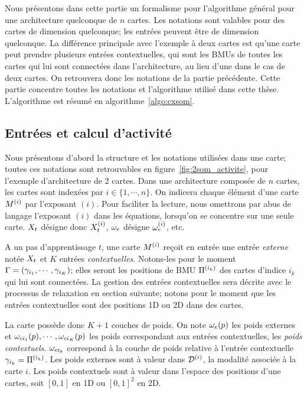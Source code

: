 Nous présentons dans cette partie un formalisme pour l'algorithme général pour une architecture quelconque de $n$ cartes. Les notations sont valables pour des cartes de dimension quelconque; les entrées peuvent être de dimension quelconque.
La différence principale avec l'exemple à deux cartes est qu'une carte peut prendre plusieurs entrées contextuelles, qui sont les BMUs de toutes les cartes qui lui sont connectées dans l'architecture, au lieu d'une dans le cas de deux cartes. On retrouvera donc les notations de la partie précédente.
Cette partie concentre toutes les notations et l'algorithme utilisé dans cette thèse. L'algorithme est résumé en algorithme~\ref{algo:cxsom}.

\subsection{Entrées et calcul d'activité}

Nous présentons d'abord la structure et les notations utilisées dans une carte; toutes ces notations sont retrouvables en figure~\ref{fig:2som_activite}, pour l'exemple d'architecture de 2 cartes. Dans une architecture composée de $n$ cartes, les cartes sont indexées par $i \in \{1,\cdots,n\}$. On indicera chaque élément d'une carte $M^{({i})}$ par l'exposant $(i)$.
Pour faciliter la lecture, nous omettrons par abus de langage l'exposant $(i)$ dans les équations, lorsqu'on se concentre sur une seule carte. $X_t$ désigne donc $X_t^{({i})}$, $\omega_e$ désigne $\omega_e^{({i})}$, etc.


A un pas d'apprentissage $t$, une carte $M^{({i})}$ reçoit en entrée une entrée \emph{externe} notée $X_t$ et $K$ entrées \emph{contextuelles}. Notons-les pour le moment $\Gamma = (\gamma_{i_1},\cdots,\gamma_{i_K})$; elles seront les positions de BMU $\Pi^{({i_k})}$ des cartes d'indice $i_k$ qui lui sont connectées. La gestion des entrées contextuelles sera décrite avec le processus de relaxation en section suivante; notons pour le moment que les entrées contextuelles sont des positions 1D ou 2D dans des cartes. 

La carte possède donc $K+1$ couches de poids. On  note $\omega_e(p)$ les poids externes et $\omega_{ci_1}(p), \cdots, \omega_{ci_K}(p)$ les poids correspondant aux entrées contextuelles, les \emph{poids contextuels}.
$\omega_{ci_k}$ correspond à la couche de poids relative à l'entrée contextuelle $\gamma_{i_k} = \Pi^{({i_k})}$. Les poids externes sont à valeur dans $\mathcal{D}^{({i})}$, la modalité associée à la carte $i$. Les poids contextuels sont à valeur dans l'espace des positions d'une cartes, soit $[0,1]$ en 1D ou $[0,1]^2$ en 2D.

